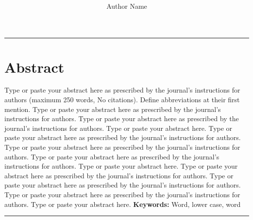 \documentclass[12pt,a4paper]{article}
\title{%
\centering\normalsize  
\vspace{-0.7in}
\colorbox{black}{\parbox{\linewidth}{\textcolor{white}{\hfill\KUS \hfill}}} \\[0.5ex]
\begin{minipage}{\dimexpr0.5\linewidth-0.5\wlogo}\oriart\end{minipage}%
\begin{minipage}{\dimexpr0.5\linewidth+0.5\wlogo-6pt}\LOGO \end{minipage}\\[0.5ex]
\colorbox{black}{\parbox{\linewidth}{\textcolor{white}{\hfill\KUni\hfill}}}\\[1ex]
\titleofArt
}
\author{Author Name}
\date{}
\begin{document}
\maketitle  
\thispagestyle{Initial}

\noindent
\rule{\textwidth}{0.4pt}
\section*{Abstract}
Type or paste your abstract here as prescribed by the journal’s instructions for authors (maximum 250 words, No citations). Define abbreviations at their first mention. Type or paste your abstract here as prescribed by the journal’s instructions for authors. Type or paste your abstract here as prescribed by the journal’s instructions for authors. Type or paste your abstract here. Type or paste your abstract here as prescribed by the journal’s instructions for authors. Type or paste your abstract here as prescribed by the journal’s instructions for authors. Type or paste your abstract here as prescribed by the journal’s instructions for authors. Type or paste your abstract here. Type or paste your abstract here as prescribed by the journal’s instructions for authors. Type or paste your abstract here as prescribed by the journal’s instructions for authors. Type or paste your abstract here as prescribed by the journal’s instructions for authors. Type or paste your abstract here.
\hfill \break
\hfill \break
\textbf{Keywords:} Word, lower case, word
\hfill \break
\noindent
\rule{\textwidth}{0.4pt}
\end{document}
